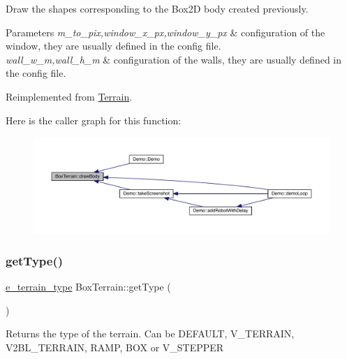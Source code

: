 Draw the shapes corresponding to the Box2D body created previously. 
\begin{DoxyParams}{Parameters}
{\em m\+\_\+to\+\_\+pix,window\+\_\+x\+\_\+px,window\+\_\+y\+\_\+px} & configuration of the window, they are usually defined in the config file. \\
\hline
{\em wall\+\_\+w\+\_\+m,wall\+\_\+h\+\_\+m} & configuration of the walls, they are usually defined in the config file. \\
\hline
\end{DoxyParams}


Reimplemented from \mbox{\hyperlink{class_terrain_ae60571b91c1979fa94bdfc5002da6ac7}{Terrain}}.

Here is the caller graph for this function\+:\nopagebreak
\begin{figure}[H]
\begin{center}
\leavevmode
\includegraphics[width=350pt]{class_box_terrain_a309e67722a008ef166198d36add1690a_icgraph}
\end{center}
\end{figure}
\mbox{\label{class_box_terrain_a8056b743b0cc1fbd38e742f542dfa34b}} 
\subsubsection{\texorpdfstring{get\+Type()}{getType()}}
{\footnotesize\ttfamily \mbox{\hyperlink{_terrain_8h_a6d0b7e83bb7325270c1162bece970fd8}{e\+\_\+terrain\+\_\+type}} Box\+Terrain\+::get\+Type (\begin{DoxyParamCaption}{ }\end{DoxyParamCaption})\hspace{0.3cm}{\ttfamily [virtual]}}

\begin{DoxyReturn}{Returns}
the type of the terrain. Can be D\+E\+F\+A\+U\+LT, V\+\_\+\+T\+E\+R\+R\+A\+IN, V2\+B\+L\+\_\+\+T\+E\+R\+R\+A\+IN, R\+A\+MP, B\+OX or V\+\_\+\+S\+T\+E\+P\+P\+ER 
\end{DoxyReturn}


